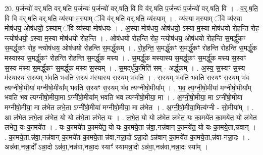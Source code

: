 \documentclass[17pt]{extarticle}
\begin{document}
20. प॒र्जन्यो॑ वर्.षति वर्.षति प॒र्जन्यः॑ प॒र्जन्यो॑ वर्.षति॒ वि वि व॑र्.षति प॒र्जन्यः॑ प॒र्जन्यो॑ वर्.षति॒ वि । . व॒र्॒.ष॒ति॒ वि वि व॑र्.षति वर्.षति॒ व्य॑स्या म॒स्याम् ॅवि व॑र्.षति वर्.षति॒ व्य॑स्याम् । . व्य॑स्या म॒स्याम् ॅवि व्य॑स्या मोष॑धय॒ ओष॑धयो॒ ऽस्याम् ॅवि व्य॑स्या मोष॑धयः । . अ॒स्या मोष॑धय॒ ओष॑धयो॒ ऽस्या म॒स्या मोष॑धयो रोहन्ति रोह॒ न्त्योष॑धयो॒ ऽस्या म॒स्या मोष॑धयो रोहन्ति । . ओष॑धयो रोहन्ति रोह॒ न्त्योष॑धय॒ ओष॑धयो रोहन्ति स॒मर्द्धु॑कꣳ स॒मर्द्धु॑कꣳ रोह॒
न्त्योष॑धय॒ ओष॑धयो रोहन्ति स॒मर्द्धु॑कम् । . रो॒ह॒न्ति॒ स॒मर्द्धु॑कꣳ स॒मर्द्धु॑कꣳ रोहन्ति रोहन्ति स॒मर्द्धु॑क मस्यास्य स॒मर्द्धु॑कꣳ रोहन्ति रोहन्ति स॒मर्द्धु॑क मस्य । . स॒मर्द्धु॑क मस्यास्य स॒मर्द्धु॑कꣳ स॒मर्द्धु॑क मस्य स॒स्यꣳ स॒स्य म॑स्य स॒मर्द्धु॑कꣳ स॒मर्द्धु॑क मस्य स॒स्यम् । . स॒मद्‌र्धु॑क॒मिति॑ सम् - अर्द्धु॑कम् । . अ॒स्य॒ स॒स्यꣳ स॒स्य म॑स्यास्य स॒स्यम् भ॑वति भवति स॒स्य म॑स्यास्य स॒स्यम् भ॑वति । . स॒स्यम् भ॑वति भवति स॒स्यꣳ स॒स्यम् भ॑व त्यग्नीषो॒मीया॑ मग्नीषो॒मीया᳚म् भवति स॒स्यꣳ स॒स्यम् 
भ॑व त्यग्नीषो॒मीया᳚म् । . भ॒व॒ त्य॒ग्नी॒षो॒मीया॑ मग्नीषो॒मीया᳚म् भवति भव त्यग्नीषो॒मीया॒मा ऽग्नी॑षो॒मीया᳚म् भवति भव त्यग्नीषो॒मीया॒ मा । . अ॒ग्नी॒षो॒मीया॒ मा ऽग्नी॑षो॒मीया॑ मग्नीषो॒मीया॒ मा ल॑भेत लभे॒ता ऽग्नी॑षो॒मीया॑ मग्नीषो॒मीया॒ मा ल॑भेत । . अ॒ग्नी॒षो॒मीया॒मित्य॑ग्नी - सो॒मीया᳚म् । . आ ल॑भेत लभे॒ता ल॑भेत॒ यो यो ल॑भे॒ता ल॑भेत॒ यः । . ल॒भे॒त॒ यो यो ल॑भेत लभेत॒ यः का॒मये॑त का॒मये॑त॒ यो ल॑भेत लभेत॒ यः का॒मये॑त । . यः का॒मये॑त का॒मये॑त॒ यो यः का॒मये॒ता न्न॑वा॒,नन्न॑वान् का॒मये॑त॒ यो यः का॒मये॒ता,न्न॑वान् । . का॒मये॒ता,न्न॑वा॒,नन्न॑वान् का॒मये॑त का॒मये॒ता न्न॑वा,नन्ना॒दो᳚ ऽन्ना॒दो ऽन्न॑वान् का॒मये॑त का॒मये॒ता,न्न॑वा-नन्ना॒दः । . अन्न॑वा,नन्ना॒दो᳚ ऽन्ना॒दो ऽन्न॑वा॒,नन्न॑वा,नन्ना॒दः स्याꣳ॑ स्यामन्ना॒दो ऽन्न॑वा॒,नन्न॑वा,नन्ना॒दः स्या᳚म् । \newline
\end{document}
